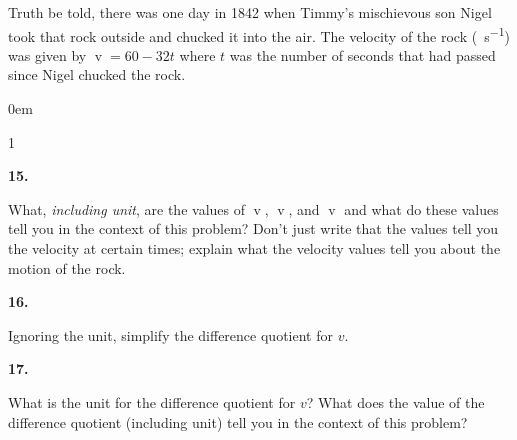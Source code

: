 \documentclass[12pt,]{book}
\theoremstyle{plain}
\theoremstyle{definition}
\numberwithin{equation}{section}
\newenvironment{exercisegroup}%
{\medskip\noindent}%
{\par\bigskip}%
\newlength{\exercisegroupindent}%
\newlength{\exercisegroupitemwidth}%
\newenvironment{exercisegrouplist}%
{\vspace{-\partopsep}%
\begin{adjustwidth}{\exercisegroupindent}{0em}}%
{\end{adjustwidth}%
\vspace{-\partopsep}%
\vspace{\baselineskip}}%
\newenvironment{exercisegroupbycol}[1]%
{\begin{exercisegrouplist}%
\vspace{-\multicolsep}%
\begin{multicols}{#1}%
\setlength{\parindent}{0em}%
\setlength{\exercisegroupitemwidth}{\linewidth}}%
{\end{multicols}%
\vspace{-\multicolsep}%
\end{exercisegrouplist}}%
\newenvironment{exercisegroupitem}[1]%
{\begin{minipage}[t]{\exercisegroupitemwidth}
\vspace{0pt}%
{\bfseries#1}%
\rule{0pt}{\baselineskip}}{\strut%
\end{minipage}%
\hspace{\columnsep}}%
\providecommand\phantomsection{}
\newcommand{\fe}[2]{\mathop{{#1}{\left(#2\right)}}}
\begin{document}
\begin{exercisegroup}%
Truth be told, there was one day in 1842 when Timmy's mischievous son Nigel took that rock outside and chucked it into the air. The velocity of the rock (\si{\foot\per\second}) was given by \(\fe{v}{t}=60-32t\) where \(t\) was the number of seconds that had passed since Nigel chucked the rock.%
\begin{exercisegroupbycol}{1}%
\begin{exercisegroupitem}{15. }\phantomsection\hypertarget{exercise-23}{\null}
What, \emph{including unit}, are the values of \(\fe{v}{0}\), \(\fe{v}{1}\), and \(\fe{v}{2}\) and what do these values tell you in the context of this problem? Don't just write that the values tell you the velocity at certain times; explain what the velocity values tell you about the motion of the rock.%
\end{exercisegroupitem}%
\par%
\begin{exercisegroupitem}{16. }\phantomsection\hypertarget{exercise-24}{\null}
Ignoring the unit, simplify the difference quotient for \(v\).%
\end{exercisegroupitem}%
\par%
\begin{exercisegroupitem}{17. }\phantomsection\hypertarget{exercise-25}{\null}
 What is the unit for the difference quotient for \(v\)? What does the value of the difference quotient (including unit) tell you in the context of this problem?%
\end{exercisegroupitem}%
\par%
\end{exercisegroupbycol}%
\end{exercisegroup}%
\end{document}
